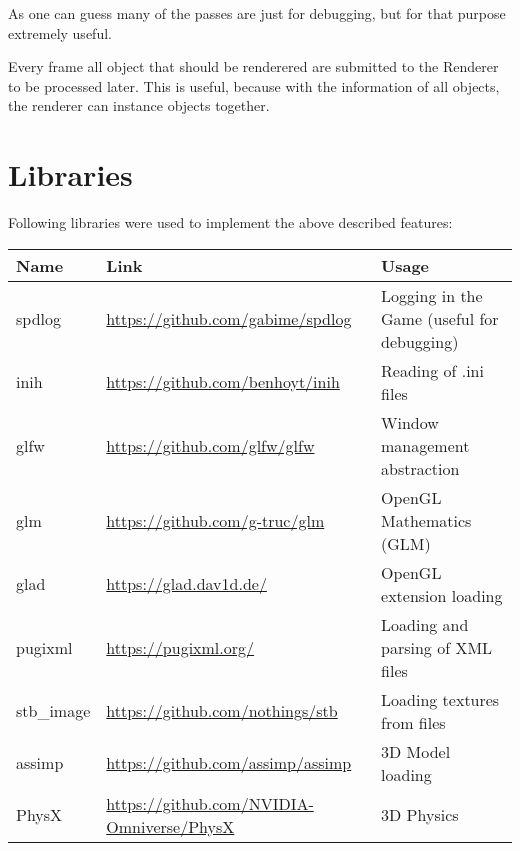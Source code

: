\documentclass{article}
\begin{document}
As one can guess many of the passes are just for debugging, but for that purpose extremely useful.

Every frame all object that should be renderered are submitted to the Renderer to be processed later. This is useful, because with the information of all objects, the renderer can instance objects together.

\section{Libraries}

Following libraries were used to implement the above described features:

\begin{tabular}{|l|l|l|}
    \hline
    Name & Link & Usage \\ \hline
    spdlog & \url{https://github.com/gabime/spdlog} & Logging in the Game (useful for debugging) \\ \hline
    inih & \url{https://github.com/benhoyt/inih} & Reading of .ini files \\ \hline
    glfw & \url{https://github.com/glfw/glfw} & Window management abstraction \\ \hline
    glm & \url{https://github.com/g-truc/glm} & OpenGL Mathematics (GLM) \\ \hline
    glad & \url{https://glad.dav1d.de/} & OpenGL extension loading \\ \hline
    pugixml & \url{https://pugixml.org/} & Loading and parsing of XML files \\ \hline
    stb\_image & \url{https://github.com/nothings/stb} & Loading textures from files \\ \hline
    assimp & \url{https://github.com/assimp/assimp} & 3D Model loading \\ \hline
    PhysX & \url{https://github.com/NVIDIA-Omniverse/PhysX} & 3D Physics \\ \hline
\end{tabular}


\end{document}
